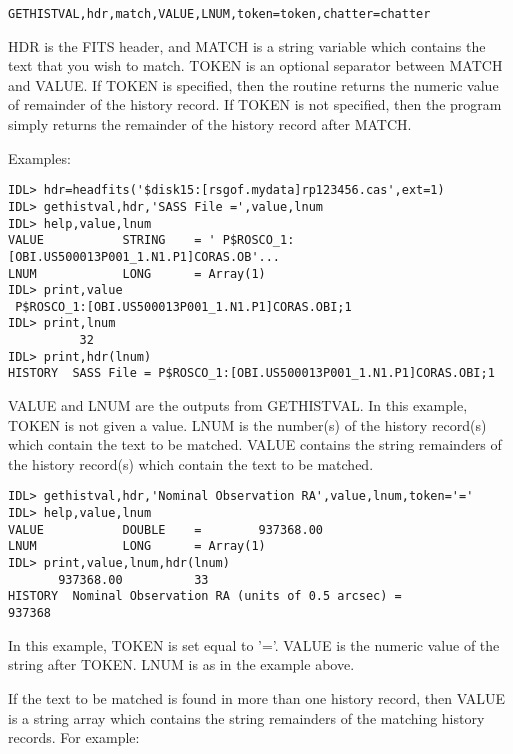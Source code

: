 \medskip\noindent
\begin{verbatim}
GETHISTVAL,hdr,match,VALUE,LNUM,token=token,chatter=chatter
\end{verbatim}
HDR is the FITS header, and MATCH is a string variable which contains the text
that you wish to match. TOKEN is an optional separator between MATCH and VALUE.
If TOKEN is specified, then the routine returns the numeric value of remainder
of the history record. If TOKEN is not specified, then the program simply
returns the remainder of the history record after MATCH.
 
Examples:

\medskip\noindent
\begin{verbatim}
IDL> hdr=headfits('$disk15:[rsgof.mydata]rp123456.cas',ext=1)
IDL> gethistval,hdr,'SASS File =',value,lnum
IDL> help,value,lnum
VALUE           STRING    = ' P$ROSCO_1:[OBI.US500013P001_1.N1.P1]CORAS.OB'...
LNUM            LONG      = Array(1)
IDL> print,value
 P$ROSCO_1:[OBI.US500013P001_1.N1.P1]CORAS.OBI;1
IDL> print,lnum
          32
IDL> print,hdr(lnum)
HISTORY  SASS File = P$ROSCO_1:[OBI.US500013P001_1.N1.P1]CORAS.OBI;1
\end{verbatim}
VALUE and LNUM are the outputs from GETHISTVAL. In this example, TOKEN is not
given a value. LNUM is the number(s) of the history record(s) which contain the
text to be matched. VALUE contains the string remainders of the history
record(s) which contain the text to be matched.

\medskip\noindent
\begin{verbatim}
IDL> gethistval,hdr,'Nominal Observation RA',value,lnum,token='='
IDL> help,value,lnum
VALUE           DOUBLE    =        937368.00
LNUM            LONG      = Array(1)
IDL> print,value,lnum,hdr(lnum)
       937368.00          33
HISTORY  Nominal Observation RA (units of 0.5 arcsec) =                 937368
\end{verbatim}
In this example, TOKEN is set equal to '='. VALUE is the numeric value of the
string after TOKEN. LNUM is as in the example above.
 
If the text to be matched is found in more than one history record, then VALUE
is a string array which contains the string remainders of the matching history
records. For example:

